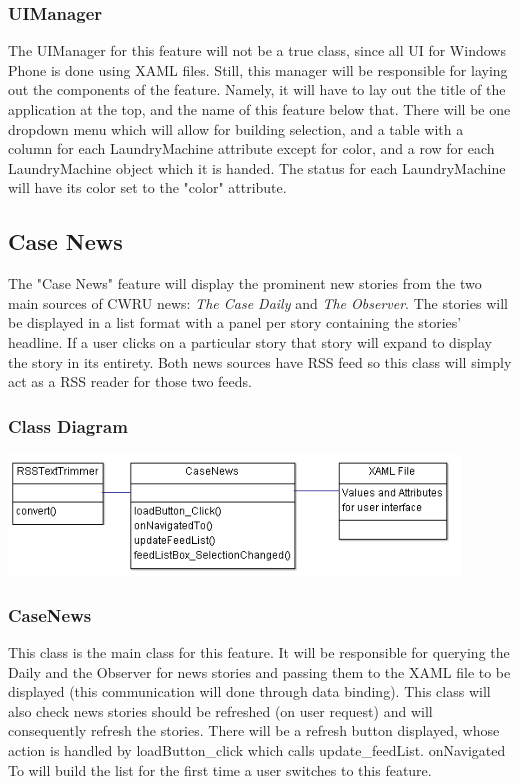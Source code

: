 \documentclass[pdftex,12pt,letter]{article}
\begin{document}
\subsubsection{UIManager}
The UIManager for this feature will not be a true class, since all UI for Windows Phone is done using XAML files. Still, this manager will be responsible for laying out the components of the feature. Namely, it will have to lay out the title of the application at the top, and the name of this feature below that. There will be one dropdown menu which will allow for building selection, and a table with a column for each LaundryMachine attribute except for color, and a row for each LaundryMachine object which it is handed. The status for each LaundryMachine will have its color set to the "color" attribute.
\subsection{Case News}
The "Case News" feature will display the prominent new stories from the
two main sources of CWRU news: \emph{The Case Daily} and \emph{The Observer}. The
stories will be displayed in a list format with a panel per story containing the
stories' headline. If a user clicks on a particular story that story will expand
to display the story in its entirety. Both news sources have RSS feed so this
class will simply act as a RSS reader for those two feeds.
\subsubsection{Class Diagram}
\includegraphics[width=120mm]{CaseNewsCD.png}
\subsubsection{CaseNews}
This class is the main class for this feature. It will be responsible for querying the Daily and the Observer for news stories and passing them to the
XAML file to be displayed (this communication will done through data binding). This class will also check news stories should be refreshed (on user
request) and will consequently refresh the stories. There will be a refresh
button displayed, whose action is handled by loadButton\_click which calls
update\_feedList. onNavigated To will build the list for the first time a user
switches to this feature.
\end{document}
